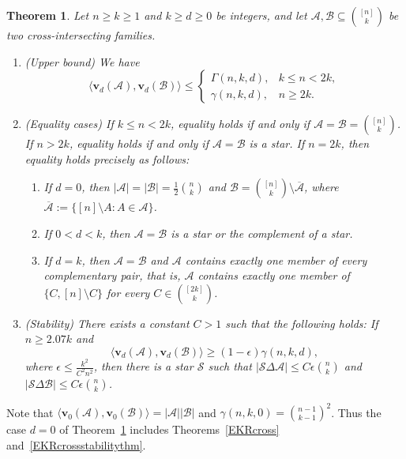 \documentclass[10pt,a4paper]{amsart}
\numberwithin{equation}{section}
\newtheorem{theorem}{Theorem}[section]
\def\A{\mathcal{A}}
\def\B{\mathcal{B}}
\def\F{\mathcal{F}}
\def\v{\mathbf{v}}
\begin{document}
\begin{theorem}\label{EKR2normmainthm}
Let $n \geq k\geq1$ and $k\geq d \geq 0$ be integers, and let
$\A,\B\subseteq \binom{[n]}{k}$ be two cross-intersecting families.
\begin{enumerate}[label={\rm (\alph*)}]
\item {\rm(Upper bound)} We have
\[
\big\langle\mathbf{v}_{d}(\A),\mathbf{v}_{d}(\B)\big\rangle
\leq
\begin{cases}
\Gamma(n,k,d),& k\leq n<2k,\\
\gamma(n,k,d),& n\geq 2k.
\end{cases}
\]

\item {\rm(Equality cases)}
If $k\leq n<2k$, equality holds if and only if
$\A=\B=\binom{[n]}k$.
If $n>2k$, equality holds if and only if $\A=\B$ is a star.
If $n=2k$, %
then equality holds precisely as follows:
\begin{enumerate}[label={\rm (\roman*)}]
\item If $d=0$, then $|\A|= |\B|=\frac{1}{2}\binom {n}{k}$ and
    $\mathcal B=\binom{[n]}k\setminus\overline{\mathcal A}$, where $\overline{\A}:=\{[n]\setminus A:A\in\A\}$.






\item If $0<d<k$, then  $\A=\B$ is a star or the complement of a star.

\item If $d=k$, then  $\A=\B$ and $\A$ contains exactly one
member of every complementary pair, that is, $\A$ contains exactly one member of $\{C,[n]\setminus C\}$ for every $C\in \binom{[2k]}{k}$.
\end{enumerate}

\item {\rm(Stability)} There exists a constant $C>1$ such that the following holds: If $n\geq 2.07k$ and
\[
\big\langle\v_d(\A),\v_d(\B)\big\rangle
\geq (1-\epsilon)\gamma(n,k,d),
\]
where $\epsilon\leq \frac{k^2}{C^2 n ^2 }$, then there is a star
$\mathcal{S}$ such that
$|\mathcal{S} \Delta \A|\leq C \epsilon \binom{n}{k}$ and
$|\mathcal{S} \Delta \B|\leq C \epsilon \binom{n}{k}$.
\end{enumerate}
\end{theorem}

Note that $\langle\mathbf{v}_0(\A),\mathbf{v}_0(\B)\rangle=|\A||\B|$ and
$\gamma(n,k,0)=\binom{n-1}{k-1}^2$.
Thus the case $d=0$ of Theorem~\ref{EKR2normmainthm} includes Theorems~\ref{EKRcross} and~\ref{EKRcrossstabilitythm}.
\end{document}
